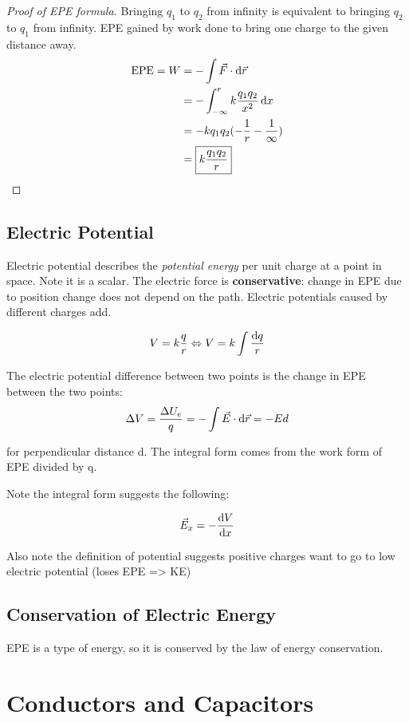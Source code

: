 \documentclass{article}
\begin{document}
\begin{proof}[Proof of EPE formula]
    Bringing $q_1$ to $q_2$ from infinity is equivalent to bringing $q_2$ to $q_1$ from infinity.
    EPE gained by work done to bring one charge to the given distance away.
    \begin{align*}
        \textrm{EPE} = W &= -\int \vec{F} \cdot \odif{\vec{r}} \\
        &= -\int_{-\infty}^{r} k \frac{q_1 q_2}{x^2} \odif{x} \\
        &= -k q_1q_2 (- \frac{1}{r} - \frac{1}{\infty}) \\
        &= \boxed{k\frac{q_1 q_2}{r}} 
    \end{align*}
\end{proof}
\subsection{Electric Potential}
Electric potential describes the \textit{potential energy} per unit charge at a point in space. Note it is a scalar.
The electric force is \textbf{conservative}: change in EPE due to position change does not depend on the path.
Electric potentials caused by different charges add.

\[V = k \frac{q}{r} \Leftrightarrow V = k \int \frac{\odif{q}}{r} \]

The electric potential difference between two points is the change in EPE between the two points:
\[\Delta V = \frac{\Delta U_e}{q} = -\int \vec{E} \cdot \odif{\vec{r}} = -Ed\]

for perpendicular distance d. The integral form comes from the work form of EPE divided by q.

Note the integral form suggests the following:

\[\vec{E}_x = -\odv{V}{x}\]

Also note the definition of potential suggests positive charges want to go to low electric potential (loses EPE => KE)

\subsection{Conservation of Electric Energy}

EPE is a type of energy, so it is conserved by the law of energy conservation.

\newpage

\section{Conductors and Capacitors}
\end{document}
